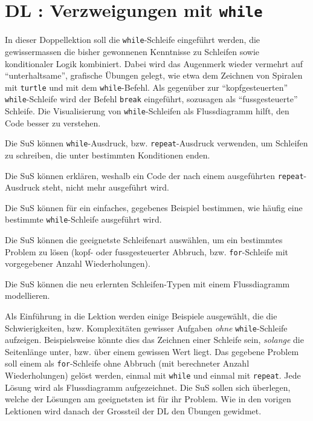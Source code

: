 \section{DL \themycounter: Verzweigungen mit \texorpdfstring{\lstinline|while|}{while}}
\begin{myExBox}[title=DL \themycounter]
In dieser Doppellektion soll die \lstinline|while|-Schleife eingeführt werden, die gewissermassen die bisher gewonnenen Kenntnisse zu Schleifen sowie konditionaler Logik kombiniert. Dabei wird das Augenmerk wieder vermehrt auf ``unterhaltsame'', grafische Übungen gelegt, wie etwa dem Zeichnen von Spiralen mit \lstinline|turtle| und mit dem \lstinline|while|-Befehl. Als gegenüber zur ``kopfgesteuerten'' \lstinline|while|-Schleife wird der Befehl \lstinline|break| eingeführt, sozusagen als ``fussgesteuerte'' Schleife. Die Visualisierung von \lstinline|while|-Schleifen als Flussdiagramm hilft, den Code besser zu verstehen.

\begin{todolist}
    \item Die SuS können \lstinline|while|-Ausdruck, bzw. \lstinline|repeat|-Ausdruck verwenden, um Schleifen zu schreiben, die unter bestimmten Konditionen enden.
    \item Die SuS können erklären, weshalb ein Code der nach einem ausgeführten \lstinline|repeat|-Ausdruck steht, nicht mehr ausgeführt wird.
    \item Die SuS können für ein einfaches, gegebenes Beispiel bestimmen, wie häufig eine bestimmte \lstinline|while|-Schleife ausgeführt wird.
    \item Die SuS können die geeignetste Schleifenart auswählen, um ein bestimmtes Problem zu lösen (kopf- oder fussgesteuerter Abbruch, bzw. \lstinline|for|-Schleife mit vorgegebener Anzahl Wiederholungen).
    \item Die SuS können die neu erlernten Schleifen-Typen mit einem Flussdiagramm modellieren.
\end{todolist}


Als Einführung in die Lektion werden einige Beispiele ausgewählt, die die Schwierigkeiten, bzw. Komplexitäten gewisser Aufgaben \textit{ohne} \lstinline|while|-Schleife aufzeigen. Beispielsweise könnte dies das Zeichnen einer Schleife sein, \textit{solange} die Seitenlänge unter, bzw. über einem gewissen Wert liegt. Das gegebene Problem soll einem als \lstinline|for|-Schleife ohne Abbruch (mit berechneter Anzahl Wiederholungen) gelöst werden, einmal mit \lstinline|while| und einmal mit \lstinline|repeat|. Jede Lösung wird als Flussdiagramm aufgezeichnet. Die SuS sollen sich überlegen, welche der Lösungen am geeignetsten ist für ihr Problem. Wie in den vorigen Lektionen wird danach der Grossteil der DL den Übungen gewidmet.


\end{myExBox}
